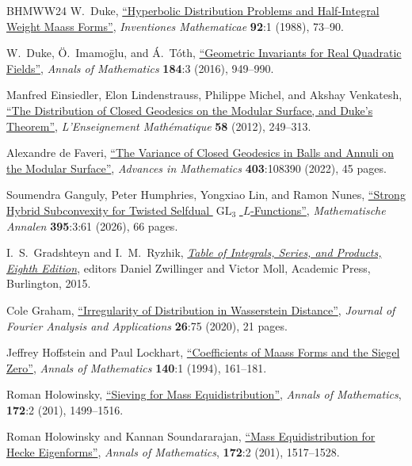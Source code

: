 \documentclass[11pt,a4paper]{amsart}
\DeclareMathOperator{\GL}{GL}
\numberwithin{equation}{section}
\theoremstyle{remark}
\theoremstyle{definition}
\begin{document}
\begin{thebibliography}{BHMWW24}
 W.~Duke, \href{https://doi.org/10.1007/BF01393993}{``Hyperbolic Distribution Problems and Half-Integral Weight Maass Forms''}, \textit{Inventiones Mathematicae} \textbf{92}:1 (1988), 73--90.

 W.~Duke, \"{O}.~Imamo\={g}lu, and \'{A}.~T\'{o}th, \href{https://doi.org/10.4007/annals.2016.184.3.8}{``Geometric Invariants for Real Quadratic Fields''}, \textit{Annals of Mathematics} \textbf{184}:3 (2016), 949--990.

 Manfred Einsiedler, Elon Lindenstrauss, Philippe Michel, and Akshay Venkatesh, \href{https://doi.org/10.4171/LEM/58-3-2}{``The Distribution of Closed Geodesics on the Modular Surface, and Duke's Theorem''}, \textit{L'Enseignement Math\'{e}matique} \textbf{58} (2012), 249--313.

 Alexandre de Faveri, \href{https://doi.org/10.1016/j.aim.2022.108390}{``The Variance of Closed Geodesics in Balls and Annuli on the Modular Surface''}, \textit{Advances in Mathematics} \textbf{403}:108390 (2022), 45 pages.

 Soumendra Ganguly, Peter Humphries, Yongxiao Lin, and Ramon Nunes, \href{https://arxiv.org/abs/2408.00596v1}{``Strong Hybrid Subconvexity for Twisted Selfdual $\GL_3$ $L$-Functions''}, \textit{Mathematische Annalen} \textbf{395}:3:61 (2026), 66 pages.

 I.~S.~Gradshteyn and I.~M.~Ryzhik, \href{https://doi.org/10.1016/C2010-0-64839-5}{\textit{Table of Integrals, Series, and Products, Eighth Edition}}, editors Daniel Zwillinger and Victor Moll, Academic Press, Burlington, 2015.

 Cole Graham, \href{https://doi.org/10.1007/s00041-020-09786-y}{``Irregularity of Distribution in Wasserstein Distance''}, \textit{Journal of Fourier Analysis and Applications} \textbf{26}:75 (2020), 21 pages.

 Jeffrey Hoffstein and Paul Lockhart, \href{https://doi.org/10.2307/2118543}{``Coefficients of Maass Forms and the Siegel Zero''}, \textit{Annals of Mathematics} \textbf{140}:1 (1994), 161--181.

 Roman Holowinsky, \href{https://doi.org/10.4007/annals.2010.172.1499}{``Sieving for Mass Equidistribution''}, \textit{Annals of Mathematics}, \textbf{172}:2 (201), 1499--1516.

 Roman Holowinsky and Kannan Soundararajan, \href{https://doi.org/10.4007/annals.2010.172.1517}{``Mass Equidistribution for Hecke Eigenforms''}, \textit{Annals of Mathematics}, \textbf{172}:2 (201), 1517--1528.


\end{thebibliography}
\end{document}
